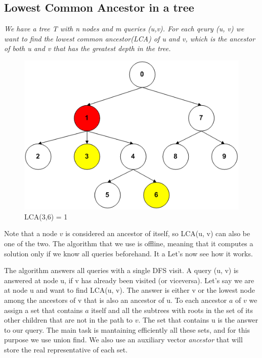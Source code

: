 \documentclass{article}
\begin{document}

\subsection{Lowest Common Ancestor in a tree}
\emph{We have a tree T with  n nodes and m queries (u,v). For each qeury (u, v) we want to find
the lowest common ancestor(LCA) of u and v, which is the ancestor of both u and v that has the greatest depth in the tree.
}
\begin{figure}[h!]
    \centering
    \includegraphics[scale = 0.5]{img/lca1.png}
    \caption{LCA(3,6) = 1}
\end{figure}

 \bigskip
 Note that a node $v$ is considered an ancestor of itself, so LCA(u, v) can also be one of the two.
 The algorithm that we use is offline, meaning that it computes a solution only if we know
 all queries beforehand. It a Let's now see how it works. 
 
 \medskip
 The algorithm answers all queries
 with a single DFS visit. A query (u, v) is answered at node u, if v has already been visited
 (or viceversa). Let's say we are at node u and want to find LCA(u, v). The answer is either v or the lowest node among
the ancestors of v that is also an ancestor of u. To each ancestor $a$  of $v$ we assign a set
that contains $a$ itself and all the subtrees with roots in the set of its other children
that are not in the path to $v$. The set that contains u is the answer to our query. The main task is mantaining
efficiently all these sets, and for this purpose we use union find. We also use an auxiliary vector \emph{ancestor} that
will store the real representative of each set.
\end{document}

